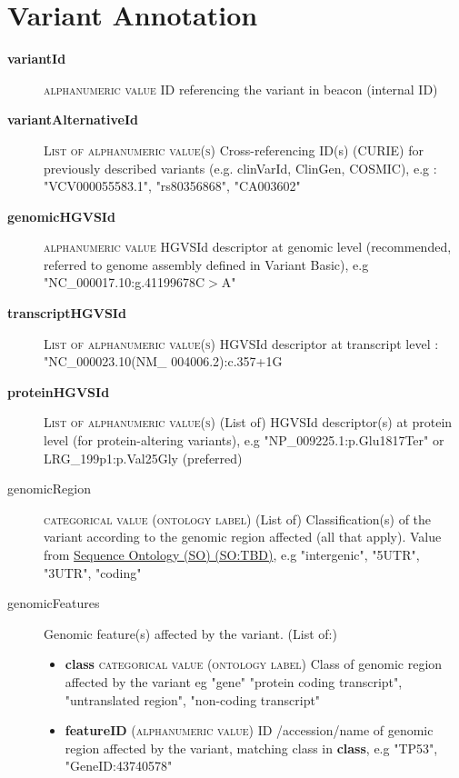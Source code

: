 \documentclass[a4paper, 10pt]{article}        %
\begin{document}
 
 
  \section*{ {\color{teal} Variant Annotation}}
  
  \begin{description}
	\item[\textbf{variantId}] {\textsc{alphanumeric value}} ID referencing the variant in beacon (internal ID)
	\item[\textbf{variantAlternativeId}] {\textsc{List of alphanumeric value(s)}} Cross-referencing ID(s) (CURIE) for previously described variants (e.g. clinVarId, ClinGen, COSMIC), e.g : "VCV000055583.1", "rs80356868", "CA003602"
	\item[\textbf{genomicHGVSId}]  {\textsc{alphanumeric value}} HGVSId descriptor at genomic level (recommended, referred to genome assembly defined in Variant Basic), e.g "NC\_000017.10:g.41199678C$>$A"
	\item[\textbf{transcriptHGVSId}] {\textsc{List of alphanumeric value(s)}} HGVSId descriptor at transcript level : "NC\_000023.10(NM\_ 004006.2):c.357+1G%
	\item[\textbf{proteinHGVSId}] {\textsc{List of alphanumeric value(s)}} (List of) HGVSId descriptor(s) at protein level (for protein-altering variants), e.g "NP\_009225.1:p.Glu1817Ter" or LRG\_199p1:p.Val25Gly (preferred)
	\item[genomicRegion] {\textsc{categorical value (ontology label)}} (List of) Classification(s) of the variant according to the genomic region affected (all that apply). Value from \href{link}{Sequence Ontology (SO) (SO:TBD)}, e.g "intergenic", "5UTR", "3UTR", "coding" %
	\item[genomicFeatures] Genomic feature(s) affected by the variant. (List of:)
	\begin{itemize}
			\item[]  \textbf{class} {\textsc{categorical value (ontology label)}} Class of genomic region affected by the variant eg "gene" "protein coding transcript", "untranslated region", "non-coding transcript"
			\item[]  \textbf{featureID} {\textsc{(alphanumeric value)}} ID /accession/name of genomic region affected by the variant, matching class in \textbf{class}, e.g "TP53", "GeneID:43740578"
	

\end{itemize}
\end{description}
\end{document}
